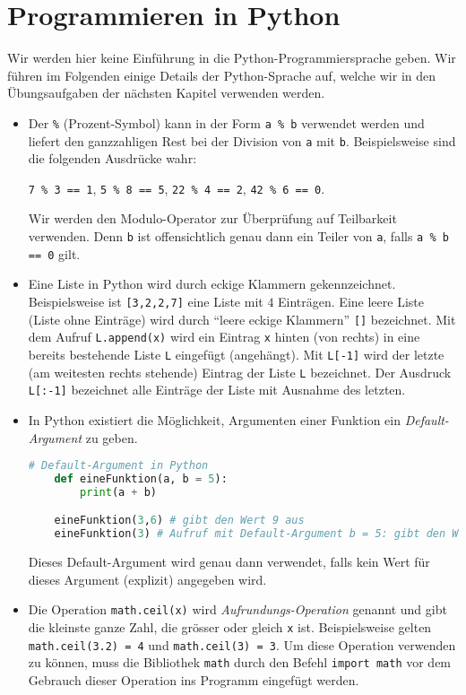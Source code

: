 \section{Programmieren in Python}
Wir werden hier keine Einführung in die Python-Programmiersprache geben. Wir führen im Folgenden einige Details der Python-Sprache auf, welche wir in den Übungsaufgaben der nächsten Kapitel verwenden werden.
\begin{itemize}
    \item Der  \verb|%| (Prozent-Symbol) kann in der Form \verb|a % b| verwendet werden und liefert den ganzzahligen Rest bei der Division von \verb|a| mit \verb|b|. Beispielsweise sind die folgenden Ausdrücke wahr:
    \begin{center}
        \verb|7 % 3 == 1|, \quad \verb|5 % 8 == 5|, \quad \verb|22 % 4 == 2|, \quad \verb|42 % 6 == 0|.
    \end{center}
    Wir werden den Modulo-Operator zur Überprüfung auf Teilbarkeit verwenden. Denn \verb|b| ist offensichtlich genau dann ein Teiler von \verb|a|, falls \verb|a % b == 0| gilt.
    \item Eine Liste in Python wird durch eckige Klammern gekennzeichnet. Beispielsweise ist \verb|[3,2,2,7]| eine Liste mit $4$ Einträgen. Eine leere Liste (Liste ohne Einträge) wird durch \enquote{leere eckige Klammern} \verb|[]| bezeichnet. Mit dem Aufruf \verb|L.append(x)| wird ein Eintrag \verb|x| hinten (von rechts) in eine bereits bestehende Liste \verb|L| eingefügt (angehängt). Mit \verb|L[-1]| wird der letzte (am weitesten rechts stehende) Eintrag der Liste \verb|L| bezeichnet. Der Ausdruck \verb|L[:-1]| bezeichnet alle Einträge der Liste mit Ausnahme des letzten.
    \item In Python existiert die Möglichkeit, Argumenten einer Funktion ein \textit{Default-Argument} zu geben.
    \begin{lstlisting}[language=Python,caption=Default-Argument,numbers=none]
    # Default-Argument in Python
    def eineFunktion(a, b = 5):
        print(a + b)

    eineFunktion(3,6) # gibt den Wert 9 aus
    eineFunktion(3) # Aufruf mit Default-Argument b = 5: gibt den Wert 8 aus
    \end{lstlisting}
    Dieses Default-Argument wird genau dann verwendet, falls kein Wert für dieses Argument (explizit) angegeben wird.
    \item Die Operation \verb|math.ceil(x)| wird \textit{Aufrundungs-Operation} genannt und gibt die kleinste ganze Zahl, die grösser oder gleich \verb|x| ist. Beispielsweise gelten \verb|math.ceil(3.2) = 4| und \verb|math.ceil(3) = 3|. Um diese Operation verwenden zu können, muss die Bibliothek \verb|math| durch den Befehl \verb|import math| vor dem Gebrauch dieser Operation ins Programm eingefügt werden.
\end{itemize}
